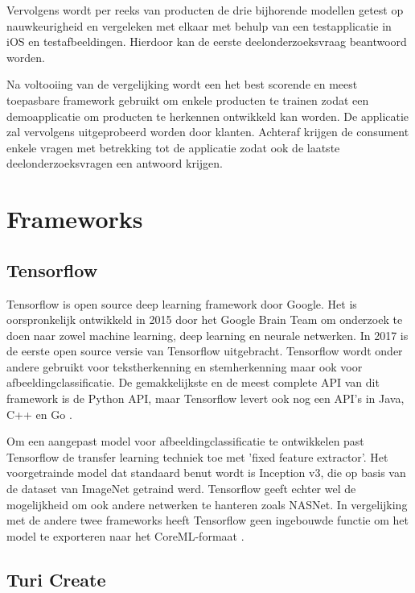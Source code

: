Vervolgens wordt per reeks van producten de drie bijhorende modellen getest op nauwkeurigheid en vergeleken met elkaar met behulp van een testapplicatie in iOS en testafbeeldingen. Hierdoor kan de eerste deelonderzoeksvraag beantwoord worden.

Na voltooiing van de vergelijking wordt een het best scorende en meest toepasbare framework gebruikt om enkele producten te trainen zodat een demoapplicatie om producten te herkennen ontwikkeld kan worden. De applicatie zal vervolgens uitgeprobeerd worden door klanten. Achteraf krijgen de consument enkele vragen met betrekking tot de applicatie zodat ook de laatste deelonderzoeksvragen een antwoord krijgen. 
\section{Frameworks}
\label{sec:Frameworks}

\subsection{Tensorflow}
\label{ssec:Tensorflow}

Tensorflow is open source deep learning framework door Google. Het is oorspronkelijk ontwikkeld in 2015 door het Google Brain Team om onderzoek te doen naar zowel machine learning, deep learning en neurale netwerken. In 2017 is de eerste open source versie van Tensorflow uitgebracht. Tensorflow wordt onder andere gebruikt voor tekstherkenning en stemherkenning maar ook voor afbeeldingclassificatie. De gemakkelijkste en de meest complete \acrshort{API} van dit framework is de Python \acrshort{API}, maar Tensorflow levert ook nog een API’s in Java, C++ en Go \autocite{introTensorflow}.

Om een aangepast model voor afbeeldingclassificatie te ontwikkelen past Tensorflow de transfer learning techniek toe met 'fixed feature extractor'. Het voorgetrainde model dat standaard benut wordt is Inception v3, die op basis van de dataset van ImageNet getraind werd. Tensorflow geeft echter wel de mogelijkheid om ook andere netwerken te hanteren zoals NASNet. In vergelijking met de andere twee frameworks heeft Tensorflow geen ingebouwde functie om het model te exporteren naar het CoreML-formaat \autocite{deeplearningTensor}.

\subsection{Turi Create}
\label{ssec:Turi Create}

